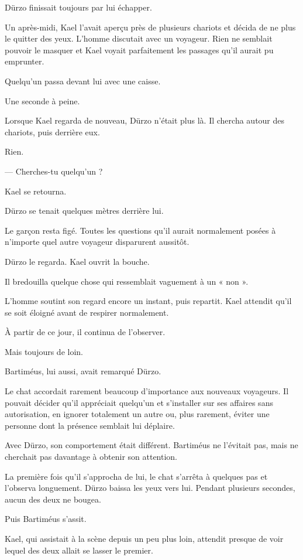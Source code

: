 Dürzo finissait toujours par lui échapper.

Un après-midi, Kael l'avait aperçu près de plusieurs chariots et décida de ne
plus le quitter des yeux. L'homme discutait avec un voyageur. Rien ne semblait
pouvoir le masquer et Kael voyait parfaitement les passages qu'il aurait pu
emprunter.

Quelqu'un passa devant lui avec une caisse.

Une seconde à peine.

Lorsque Kael regarda de nouveau, Dürzo n'était plus là. Il chercha autour des
chariots, puis derrière eux.

Rien.

— Cherches-tu quelqu'un ?

Kael se retourna.

Dürzo se tenait quelques mètres derrière lui.

Le garçon resta figé. Toutes les questions qu'il aurait normalement posées à
n'importe quel autre voyageur disparurent aussitôt.

Dürzo le regarda. Kael ouvrit la bouche.

Il bredouilla quelque chose qui ressemblait vaguement à un « non ».

L'homme soutint son regard encore un instant, puis repartit. Kael attendit
qu'il se soit éloigné avant de respirer normalement.

À partir de ce jour, il continua de l'observer.

Mais toujours de loin.

\scenebreak

Bartiméus, lui aussi, avait remarqué Dürzo.

Le chat accordait rarement beaucoup d'importance aux nouveaux voyageurs. Il
pouvait décider qu'il appréciait quelqu'un et s'installer sur ses affaires sans
autorisation, en ignorer totalement un autre ou, plus rarement, éviter une
personne dont la présence semblait lui déplaire.

Avec Dürzo, son comportement était différent. Bartiméus ne l'évitait pas, mais
ne cherchait pas davantage à obtenir son attention.

La première fois qu'il s'approcha de lui, le chat s'arrêta à quelques pas et
l'observa longuement. Dürzo baissa les yeux vers lui. Pendant plusieurs
secondes, aucun des deux ne bougea.

Puis Bartiméus s'assit.

Kael, qui assistait à la scène depuis un peu plus loin, attendit presque de
voir lequel des deux allait se lasser le premier.

